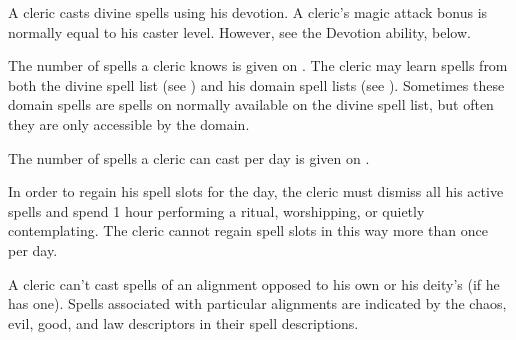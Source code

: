 A cleric casts divine spells using his devotion.
A cleric's magic attack bonus is normally equal to his caster level.
However, see the Devotion ability, below.

The number of spells a cleric knows is given on .
The cleric may learn spells from both the divine spell list (see ) and his domain spell lists (see ).
Sometimes these domain spells are spells on normally available on the divine spell list, but often they are only accessible by the domain.

The number of spells a cleric can cast per day is given on .

In order to regain his spell slots for the day, the cleric must dismiss all his active spells and spend 1 hour performing a ritual, worshipping, or quietly contemplating.
The cleric cannot regain spell slots in this way more than once per day.

A cleric can't cast spells of an alignment opposed to his own or his deity's (if he has one).
Spells associated with particular alignments are indicated by the chaos, evil, good, and law descriptors in their spell descriptions.

